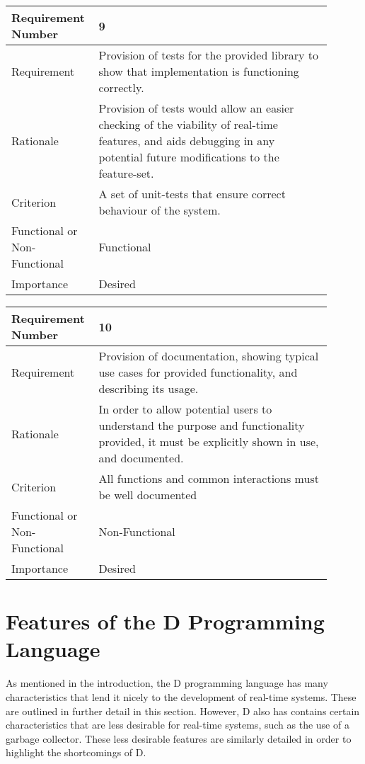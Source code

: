 \begin{table}[!htbp]
\centering
\begin{tabular}{|L{0.2\linewidth}|L{0.7\linewidth}|}
\hline
Requirement Number   & 9 \\ \hline
Requirement & Provision of tests for the provided library to show that 
                implementation is functioning correctly. \\ \hline
Rationale      & Provision of tests would allow an easier checking of the viability of  
                real-time features, and aids debugging in any potential future 
                modifications to the feature-set. \\ \hline
Criterion      & A set of unit-tests that ensure correct behaviour of the system. \\ \hline
Functional or Non-Functional & Functional \\ \hline
Importance     & Desired \\ \hline
\end{tabular}
\end{table}
\begin{table}[!htbp]
\centering
\begin{tabular}{|L{0.2\linewidth}|L{0.7\linewidth}|}
\hline
Requirement Number & 10 \\ \hline
Requirement & Provision of documentation, showing typical use cases for provided 
                functionality, and describing its usage. \\ \hline
Rationale      & In order to allow potential users to understand the purpose and 
                functionality provided, it must be explicitly shown in use, and
                documented.  \\ \hline
Criterion      & All functions and common interactions must be well documented \\ \hline
Functional or Non-Functional & Non-Functional \\ \hline
Importance     & Desired \\ \hline
\end{tabular}
\end{table}
\FloatBarrier



\section{Features of the D Programming Language}
As mentioned in the introduction, the D programming language has many 
characteristics that lend it nicely to the development of real-time systems.
These are outlined in further detail in this section. 
However, D also has contains certain characteristics that are less desirable for 
real-time systems, such as the use of a garbage collector. 
These less desirable features are similarly detailed in order to highlight the 
shortcomings of D. 

